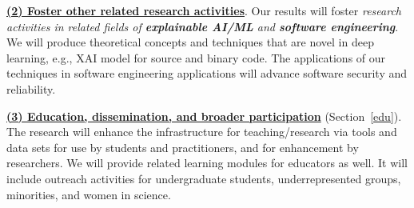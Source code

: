 \noindent\underline{{\bf (2) Foster other related research
    activities}}. Our results will foster {\em research activities in
  related fields of {\bf explainable AI/ML} and {\bf software
    engineering}}. We will produce theoretical concepts and techniques
that are novel in deep learning, e.g., XAI model for source and binary
code. The applications of our techniques in software engineering
applications will advance software security and reliability.



\noindent\underline{{\bf (3) Education, dissemination, and broader participation}} (Section~\ref{edu}). The
research will enhance the infrastructure for teaching/research via
tools and data sets for use by students and practitioners, and for
enhancement by researchers. We will provide related learning
modules for educators as well. It will include outreach activities for
undergraduate students, underrepresented groups, minorities, and women
in science.



